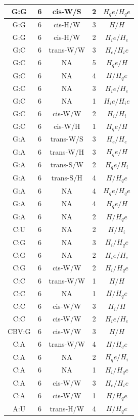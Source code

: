 \begin{center}
\begin{longtable}{c|c|c|c|c}
G:G & 6 & cis-W/S & 2 & $H_qe/H_qe$ \\  \hline
G:G & 6 & cis-H/W & 3 & $H/H$ \\  \hline
G:G & 6 & cis-H/W & 2 & $H_ie/H_e$ \\  \hline
G:C & 6 & trans-W/W & 3 & $H_e/H_ie$ \\  \hline
G:C & 6 & NA & 5 & $H_qe/H$ \\  \hline
G:C & 6 & NA & 4 & $H/H_qe$ \\  \hline
G:C & 6 & NA & 3 & $H_ie/H_e$ \\  \hline
G:C & 6 & NA & 1 & $H_ie/H_ie$ \\  \hline
G:C & 6 & cis-W/W & 2 & $H_i/H_i$ \\  \hline
G:C & 6 & cis-W/H & 1 & $H_qe/H$ \\  \hline
G:A & 6 & trans-W/S & 3 & $H_e/H_e$ \\  \hline
G:A & 6 & trans-W/H & 3 & $H_qe/H$ \\  \hline
G:A & 6 & trans-S/W & 2 & $H_qe/H_i$ \\  \hline
G:A & 6 & trans-S/H & 4 & $H/H_qe$ \\  \hline
G:A & 6 & NA & 4 & $H_qe/H_qe$ \\  \hline
G:A & 6 & NA & 4 & $H_qe/H$ \\  \hline
G:A & 6 & NA & 2 & $H/H_qe$ \\  \hline
C:U & 6 & NA & 2 & $H/H_i$ \\  \hline
C:G & 6 & NA & 3 & $H_i/H_qe$ \\  \hline
C:G & 6 & NA & 2 & $H_ie/H_e$ \\  \hline
C:G & 6 & cis-W/W & 2 & $H_i/H_qe$ \\  \hline
C:C & 6 & trans-W/W & 1 & $H/H$ \\  \hline
C:C & 6 & NA & 1 & $H/H_qe$ \\  \hline
C:C & 6 & cis-W/W & 3 & $H_i/H$ \\  \hline
C:C & 6 & cis-W/W & 2 & $H_ie/H_e$ \\  \hline
CBV:G & 6 & cis-W/W & 3 & $H/H$ \\  \hline
C:A & 6 & trans-W/W & 4 & $H/H_qe$ \\  \hline
C:A & 6 & NA & 2 & $H_qe/H_i$ \\  \hline
C:A & 6 & NA & 1 & $H_i/H_qe$ \\  \hline
C:A & 6 & cis-W/W & 3 & $H_e/H_ie$ \\  \hline
C:A & 6 & cis-W/W & 1 & $H/H_qe$ \\  \hline
A:U & 6 & trans-H/W & 4 & $H/H_qe$ \\  \hline

\end{longtable}
\end{center}
